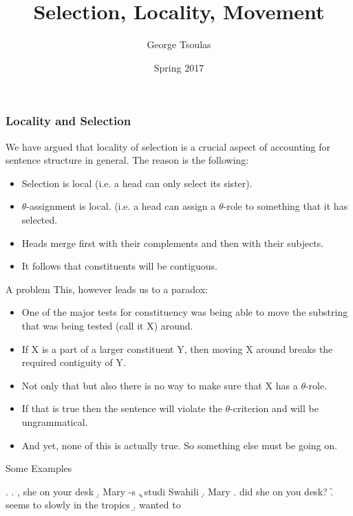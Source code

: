 


\title{Selection, Locality, Movement}
\date{Spring 2017}
\author{George Tsoulas}


\maketitle

\begin{frame}
  \frametitle{Locality and Selection}
We have argued that locality of selection is a crucial aspect of accounting for sentence structure in general.  The reason is the following:


\begin{itemize}
\item Selection is local (i.e. a head can only select its sister).
\item $\theta$-assignment is local. (i.e. a head can assign a $\theta$-role to something that it has selected.
\item Heads merge first with their complements and then with their subjects.
\item It follows that constituents will be contiguous.
\end{itemize}
\end{frame}

\begin{frame}
  {A problem}
This, however leads us to a paradox:

\begin{itemize}
\item One of the major tests for constituency was being able to move the substring that was being tested (call it X) around.
\item If X is a part of a larger constituent Y, then moving X around breaks the required contiguity of Y.
\item Not only that but also there is no way to make sure that X has a $\theta$-role.
\item If that is true then the sentence will violate the $\theta$-criterion and will be ungrammatical. \pause
\item  And yet, none of this is actually true.  So something else must be going on. 
\end{itemize}
\end{frame}

\begin{frame}
  {Some Examples}

\ex.
\a.
, she  on your desk
\b.
Mary -s 
\c.
 studi \framebox{[$_T$ -ed]} Swahili
\d.
 Mary 
\e.
 did she  on you desk?
\f.
 seems to  slowly in the tropics
\b.
 wanted to 

\end{frame}



